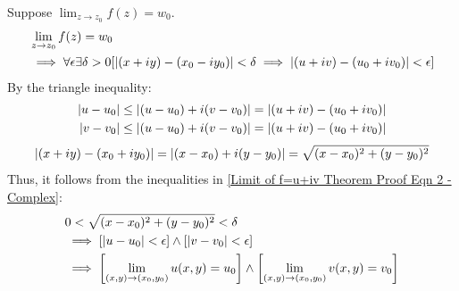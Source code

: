 \documentclass[12pt, english]{book}
\makeatletter
\renewenvironment{proof}[1][\proofname]{\par
	\pushQED{\qed}%
	\normalfont \topsep6\p@\@plus6\p@\relax
	\list{}{%
		\settowidth{\leftmargin}{\itshape\proofname:\hskip\labelsep}%
		\setlength{\labelwidth}{0pt}%
		\setlength{\itemindent}{-\leftmargin}%
	}%
	\item[\hskip\labelsep\itshape#1\@addpunct{:}]\ignorespaces
	}{ \popQED\endlist\@endpefalse}
\makeatother
\begin{document}
\begin{proof}
		Suppose $\lim_{z \rightarrow z_0} f(z) = w_0$.
		\begin{align}
			\label{Limit of f=u+iv Theorem Proof Eqn 2 - Complex}
			&\lim_{z \rightarrow z_0} f(z) = w_0 \\ \nonumber
			&\implies \forall \epsilon \exists \delta>0 [\abs{(x+iy)-(x_0-iy_0)}<\delta \implies \abs{(u+iv) - (u_0+iv_0)}<\epsilon]
		\end{align}
		By the triangle inequality: 
		\begin{align*}
			\abs{u-u_0} &\leq \abs{(u-u_0) + i(v-v_0)} = \abs{(u+iv) - (u_0 + iv_0)} \\
			\abs{v-v_0} &\leq \abs{(u-u_0) + i(v-v_0)} = \abs{(u+iv) - (u_0 + iv_0)} 
		\end{align*}
		$$\abs{(x+iy) - (x_0 + iy_0)} = \abs{(x-x_0) + i(y-y_0)} = \sqrt{(x-x_0)^2 + (y-y_0)^2}$$
		Thus, it follows from the inequalities in \cref{Limit of f=u+iv Theorem Proof Eqn 2 - Complex}:
		\begin{align*}
			&0 < \sqrt{(x-x_0)^2 + (y-y_0)^2} < \delta  \\
			&\implies [\abs{u-u_0} < \epsilon ]\land [\abs{v-v_0} < \epsilon] \\
			&\implies \left[\lim_{(x,y) \rightarrow (x_0, y_0)} u(x,y) = u_0 \right] \land
			\left[\lim_{(x,y) \rightarrow (x_0, y_0)} v(x,y) = v_0 \right]
		\end{align*}
	\end{proof}
\end{document}

